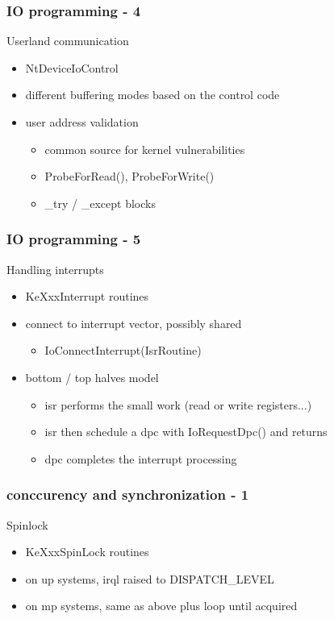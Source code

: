 
\begin{frame}
 \frametitle{IO programming - 4}

 Userland communication

 \begin{itemize}
  \item NtDeviceIoControl
  \item different buffering modes based on the control code
  \item user address validation
  \begin{itemize}
   \item common source for kernel vulnerabilities
   \item ProbeForRead(), ProbeForWrite()
   \item \_try / \_except {} blocks
  \end{itemize}
 \end{itemize}

\end{frame}


\begin{frame}
 \frametitle{IO programming - 5}

 Handling interrupts

 \begin{itemize}
  \item KeXxxInterrupt routines

  \item connect to interrupt vector, possibly shared
   \begin{itemize}
   \item IoConnectInterrupt(IsrRoutine)
  \end{itemize}

  \item bottom / top halves model
  \begin{itemize}
   \item isr performs the small work (read or write registers...)
   \item isr then schedule a dpc with IoRequestDpc() and returns
   \item dpc completes the interrupt processing
  \end{itemize}

 \end{itemize}

\end{frame}


\begin{frame}
 \frametitle{conccurency and synchronization - 1}

 Spinlock

 \begin{itemize}
  \item KeXxxSpinLock routines
  \item on up systems, irql raised to DISPATCH\_LEVEL
  \item on mp systems, same as above plus loop until acquired
 \end{itemize}

\end{frame}

